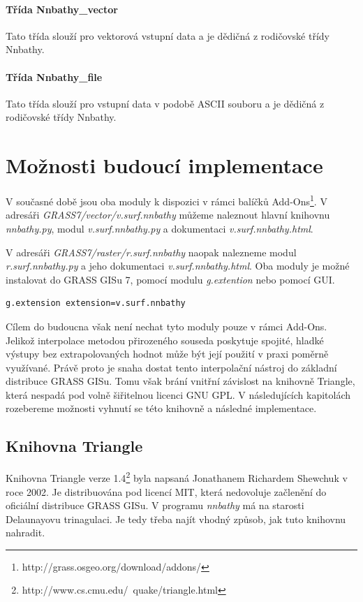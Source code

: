\documentclass[12pt,a4paper]{article}
\begin{document}
\paragraph{Třída Nnbathy\_vector}
Tato třída slouží pro vektorová vstupní data a je dědičná z rodičovské třídy Nnbathy.

\paragraph{Třída Nnbathy\_file}
Tato třída slouží pro vstupní data v podobě ASCII souboru a je dědičná z rodičovské třídy Nnbathy.





\newpage
\section{Možnosti budoucí implementace}
V současné době jsou oba moduly k dispozici v rámci balíčků Add-Ons\footnote{http://grass.osgeo.org/download/addons/}. V adresáři \emph{GRASS7/vector/v.surf.nnbathy} můžeme  naleznout hlavní knihovnu \emph{nnbathy.py}, modul \emph{v.surf.nnbathy.py} a dokumentaci \emph{v.surf.nnbathy.html}. 

V adresáři \emph{GRASS7/raster/r.surf.nnbathy} naopak nalezneme modul \emph{r.surf.nnbathy.py} a jeho dokumentaci \emph{v.surf.nnbathy.html}. Oba moduly je možné instalovat do GRASS GISu 7, pomocí modulu \emph{g.extention} nebo pomocí GUI.

\bigskip
\begin{lstlisting}[caption={Stáhnutí modulu v.surf.nnbathy pomocí g.extention}]
g.extension extension=v.surf.nnbathy
\end{lstlisting}

\bigskip
Cílem do budoucna však není nechat tyto moduly pouze v rámci Add-Ons. Jelikož interpolace metodou přirozeného souseda poskytuje spojité, hladké výstupy bez extrapolovaných hodnot může být její použití v praxi poměrně využívané. Právě proto je snaha dostat tento interpolační nástroj do základní distribuce GRASS GISu. Tomu však brání vnitřní závislost na knihovně Triangle, která nespadá pod volně šiřitelnou licenci GNU GPL. V následujících kapitolách rozebereme možnosti vyhnutí se této knihovně a následné implementace.

\newpage
\subsection{Knihovna Triangle}
Knihovna Triangle verze 1.4\footnote{http://www.cs.cmu.edu/~quake/triangle.html} byla napsaná Jonathanem Richardem Shewchuk v roce 2002. Je distribuována pod licencí MIT, která nedovoluje začlenění do oficiální distribuce GRASS GISu. V programu \emph{nnbathy} má na starosti Delaunayovu trinagulaci. Je tedy třeba najít vhodný způsob, jak tuto knihovnu nahradit.
\end{document}
